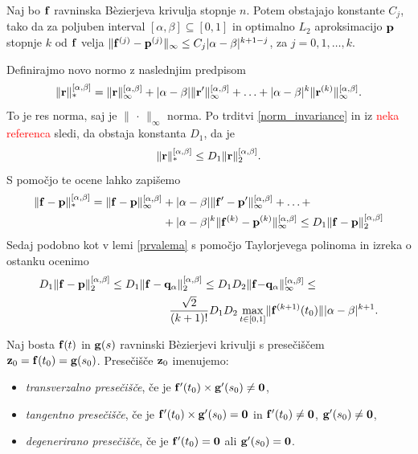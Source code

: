 \begin{lema}\label{drugalema}
Naj bo ${\bf f}$ ravninska B\`{e}zierjeva krivulja stopnje $n$. Potem obstajajo konstante $C_{j}$, tako da za poljuben interval $[\alpha,\beta]\subseteq[0,1]$ in optimalno $L_2$ aproksimacijo ${\bf p}$ stopnje $k$ od ${\bf f}$ velja
$\lVert {\bf f}^{(j)} - {\bf p}^{(j)} \rVert _{\infty} \leq C_{j}|\alpha - \beta|^{k+1-j}$, za $j=0,1,\ldots,k$. 
\end{lema}
\proof
Definirajmo novo normo z naslednjim predpisom
$$
\lVert {\bf r}\rVert _{*}^{[\alpha,\beta]} = \lVert {\bf r}\rVert _\infty^{[\alpha,\beta]} + |\alpha - \beta|\lVert {\bf r}'\rVert _\infty^{[\alpha,\beta]} + \ldots + 
 |\alpha - \beta|^k\lVert {\bf r}^{(k)}\rVert _\infty^{[\alpha,\beta]}.
$$
To je res norma, saj je $\lVert \,\cdot\, \rVert _\infty$ norma. Po trditvi \ref{norm_invariance} in iz \textcolor{Red}{neka referenca} sledi, da obstaja konstanta $D_1$, da je 
$$
\lVert {\bf r}\rVert _{*}^{[\alpha,\beta]} \leq D_1 \lVert {\bf r}\rVert _{2}^{[\alpha,\beta]}.
$$
S pomočjo te ocene lahko zapišemo 
\begin{align*}
\lVert {\bf f} - {\bf p}\rVert _{*}^{[\alpha,\beta]}  =  \lVert {\bf f} - {\bf p}\rVert _\infty^{[\alpha,\beta]}  &+  |\alpha - \beta|\lVert {\bf f}' - {\bf p}'\rVert _\infty^{[\alpha,\beta]} + \ldots +\\ 
   & +  |\alpha - \beta|^k\lVert {\bf f}^{(k)} - {\bf p}^{(k)}\rVert _\infty^{[\alpha,\beta]} \leq 
 D_1 \lVert {\bf f} - {\bf p}\rVert _{2}^{[\alpha,\beta]}
\end{align*}
Sedaj podobno kot v lemi \ref{prvalema} s pomočjo Taylorjevega polinoma in izreka o ostanku ocenimo
\begin{align*}
D_1 \lVert {\bf f} - {\bf p}\rVert _{2}^{[\alpha,\beta]} \leq 
D_1 \lVert {\bf f} - {\bf q}_\alpha\rVert _{2}^{[\alpha,\beta]} \leq 
D_1D_2 \lVert {\bf f} - &{\bf q}_\alpha\rVert _{\infty}^{[\alpha,\beta]} \leq \\
\frac{\sqrt{2}}{(k+1)!}  D_1D_2\max _{t\in [0,1]}& \lVert {\bf f}^{(k+1)}(t_0) \rVert |\alpha - \beta|^{k+1}.
\end{align*}
\endproof

\begin{definicija}
Naj bosta ${\bf f}(t)$ in ${\bf g}(s)$ ravninski B\`{e}zierjevi krivulji s presečiščem ${\bf z}_0 = {\bf f}(t_0) = {\bf g}(s_0)$. Presečišče ${\bf z}_0$ imenujemo:
\begin{itemize}
	\setlength\itemsep{0.33em}
\item {\em transverzalno presečišče}, če je ${\bf f}'(t_0)\times {\bf g}'(s_0) \neq {\bf 0}$,
\smallskip
\item {\em tangentno presečišče}, če je ${\bf f}'(t_0)\times {\bf g}'(s_0) = {\bf 0}$ in ${\bf f}'(t_0)\neq {\bf 0}$, ${\bf g}'(s_0)\neq {\bf 0}$, 
\smallskip
\item {\em degenerirano presečišče}, če je ${\bf f}'(t_0) = {\bf 0}$ ali ${\bf g}'(s_0) = {\bf 0}$.
\end{itemize}
\end{definicija}


